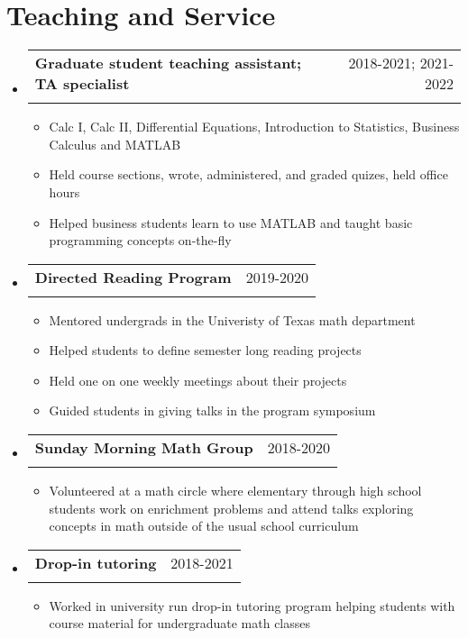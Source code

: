 \documentclass[letterpaper,11pt]{article}
\makeatletter
\newcommand{\resumeItem}[1]{
  \item{
    {#1 \vspace{-4pt}}
  }
}
\newcommand{\resumeSubheading}[4]{
  \vspace{-2pt}\item
    \begin{tabular*}{0.97\textwidth}[t]{l@{\extracolsep{\fill}}r}
      \textbf{#1} & #2 \\
      \textit{\small #3} & \textit{\small #4} \\
    \end{tabular*}\vspace{-10pt}
}
\newcommand{\resumeSubHeadingListStart}{\begin{itemize}[leftmargin=0.15in, label={}]}
\newcommand{\resumeSubHeadingListEnd}{\end{itemize}}
\newcommand{\resumeItemListStart}{\begin{itemize}}
\newcommand{\resumeItemListEnd}{\end{itemize}\vspace{-2pt}}
\makeatother
\begin{document}
\section{Teaching and Service}
\resumeSubHeadingListStart
  \resumeSubheading{Graduate student teaching assistant; TA specialist}
                   {2018-2021; 2021-2022}
                   {}{}\vspace{-2ex}
    \resumeItemListStart\small
      \resumeItem{Calc I, 
                  Calc II, 
                  Differential Equations, 
                  Introduction to Statistics, 
                  Business Calculus and MATLAB}
      \resumeItem{Held course sections, 
                  wrote, administered, and graded quizes, 
                  held office hours}
      \resumeItem{Helped business students learn to use MATLAB and taught basic programming 
                  concepts on-the-fly\vspace{-2.5ex}}
    \resumeItemListEnd
  \resumeSubheading{Directed Reading Program}{2019-2020}{}{}\vspace{-2.5ex}
    \resumeItemListStart\small
      \resumeItem{Mentored undergrads in the Univeristy of Texas math department}
      \resumeItem{Helped students to define semester long reading projects}
      \resumeItem{Held one on one weekly meetings about their projects}
      \resumeItem{Guided students in giving talks in the program symposium}
    \resumeItemListEnd
  \resumeSubheading{Sunday Morning Math Group}{2018-2020}{}{}\vspace{-2ex}
    \resumeItemListStart\small
      \resumeItem{Volunteered at a math circle where elementary through high school 
                 students work on enrichment problems and attend talks exploring 
                 concepts in math outside of the usual school curriculum}
    \resumeItemListEnd
  \resumeSubheading{Drop-in tutoring}{2018-2021}{}{}\vspace{-2ex}
    \resumeItemListStart\small
      \resumeItem{Worked in university run drop-in tutoring program helping students 
                  with course material for undergraduate math classes}
    \resumeItemListEnd
\resumeSubHeadingListEnd
\end{document}
